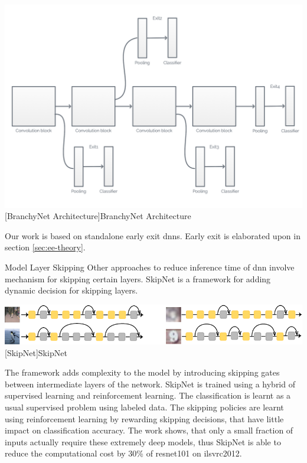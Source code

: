 \begin{enumdescript}
	\begin{minipage}[t]{\linewidth}    
		\centering                          
		\includegraphics[width=.8\linewidth]{figures/models/branchy}
		[BranchyNet Architecture]{BranchyNet Architecture}
		\label{fig:branchynet}
	\end{minipage}

	Our work is based on standalone early exit \gls{dnn}s. Early exit is elaborated upon in section \ref{sec:ee-theory}.
	
	\item[Model Layer Skipping] Other approaches to reduce inference time of \gls{dnn} involve mechanism for skipping certain layers. SkipNet \cite{wang_skipnet:_2017} is a framework for adding dynamic decision for skipping layers. 
	
	\begin{minipage}[t]{\linewidth}    
		\centering                          
		\includegraphics[width=.8\linewidth]{figures/models/skipnet}
		[SkipNet]{SkipNet}
	\end{minipage}
	
	The framework adds complexity to the model by introducing skipping gates between intermediate layers of the network. SkipNet is trained using a hybrid of supervised learning and reinforcement learning. The classification is learnt as a usual supervised problem using labeled data. The skipping policies are learnt using reinforcement learning by rewarding skipping decisions, that have little impact on classification accuracy. The work shows, that only a small fraction of inputs actually require these extremely deep models, thus SkipNet is able to reduce the computational cost by 30\% of \gls{resnet}101 on \gls{ilsvrc2012}. 
	

\end{enumdescript}
